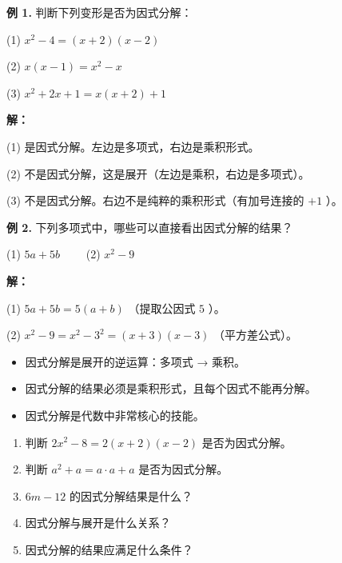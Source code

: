 \begin{workedexamples}


\textbf{例 1.} 判断下列变形是否为因式分解：

(1) $x^2 - 4 = (x+2)(x-2)$

(2) $x(x-1) = x^2 - x$

(3) $x^2 + 2x + 1 = x(x+2) + 1$

\textbf{解：}

(1) 是因式分解。左边是多项式，右边是乘积形式。

(2) 不是因式分解，这是展开（左边是乘积，右边是多项式）。

(3) 不是因式分解。右边不是纯粹的乘积形式（有加号连接的 $+1$ ）。

\textbf{例 2.} 下列多项式中，哪些可以直接看出因式分解的结果？

(1) $5a + 5b$ 　　(2) $x^2 - 9$

\textbf{解：}

(1) $5a + 5b = 5(a + b)$ （提取公因式 $5$ ）。

(2) $x^2 - 9 = x^2 - 3^2 = (x+3)(x-3)$ （平方差公式）。

\end{workedexamples}

\begin{keytakeaway}


\begin{itemize}
  \item 因式分解是展开的逆运算：多项式 → 乘积。
  \item 因式分解的结果必须是乘积形式，且每个因式不能再分解。
  \item 因式分解是代数中非常核心的技能。
\end{itemize}


\end{keytakeaway}

\begin{practice}


\begin{enumerate}
  \item 判断 $2x^2 - 8 = 2(x+2)(x-2)$ 是否为因式分解。
  \item 判断 $a^2 + a = a \cdot a + a$ 是否为因式分解。
  \item $6m - 12$ 的因式分解结果是什么？
  \item 因式分解与展开是什么关系？
  \item 因式分解的结果应满足什么条件？
\end{enumerate}


\end{practice}

